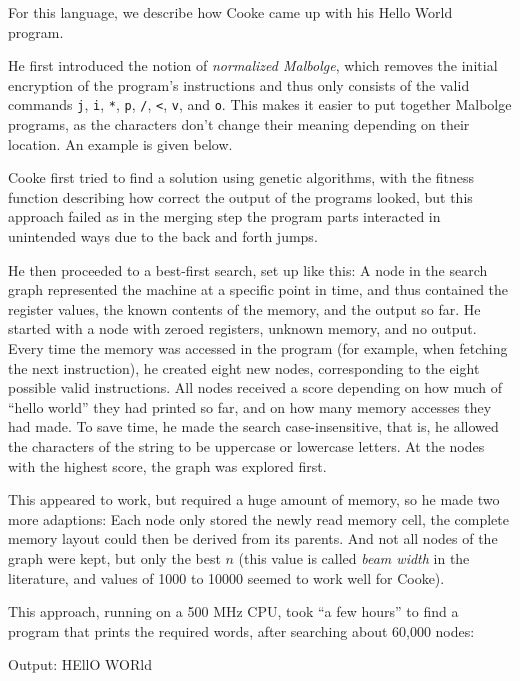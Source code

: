For this language, we describe how Cooke came up with his Hello World program.

He first introduced the notion of \emph{normalized Malbolge}, which removes the initial encryption of the program's instructions and thus only consists of the valid commands \texttt{j}, \texttt{i}, \texttt{*}, \texttt{p}, \texttt{/}, \texttt{<}, \texttt{v}, and \texttt{o}. This makes it easier to put together Malbolge programs, as the characters don't change their meaning depending on their location. An example is given below.

Cooke first tried to find a solution using genetic algorithms, with the fitness function describing how correct the output of the programs looked, but this approach failed as in the merging step the program parts interacted in unintended ways due to the back and forth jumps.

He then proceeded to a best-first search, set up like this: A node in the search graph represented the machine at a specific point in time, and thus contained the register values, the known contents of the memory, and the output so far. He started with a node with zeroed registers, unknown memory, and no output. Every time the memory was accessed in the program (for example, when fetching the next instruction), he created eight new nodes, corresponding to the eight possible valid instructions. All nodes received a score depending on how much of “hello world” they had printed so far, and on how many memory accesses they had made. To save time, he made the search case-insensitive, that is, he allowed the characters of the string to be uppercase or lowercase letters. At the nodes with the highest score, the graph was explored first.

This appeared to work, but required a huge amount of memory, so he made two more adaptions: Each node only stored the newly read memory cell, the complete memory layout could then be derived from its parents. And not all nodes of the graph were kept, but only the best $n$ (this value is called \emph{beam width} in the literature, and values of 1000 to 10000 seemed to work well for Cooke).

This approach, running on a 500 MHz CPU, took “a few hours” to find a program that prints the required words, after searching about 60,000 nodes:



\begin{io}
Output: HEllO WORld
\end{io}

